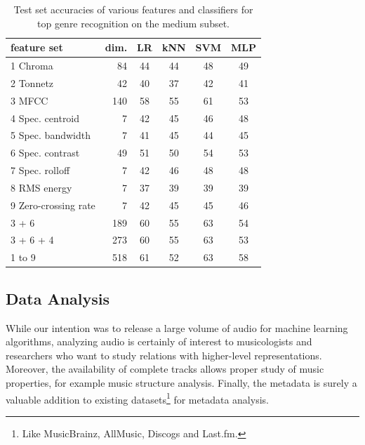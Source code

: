 \documentclass{article}
\newcommand{\tspaceb}{\hspace{0.9em}}
\begin{document}

\begin{table}
	\small
	\centering
	\begin{tabular}{l@{\tspaceb}r@{\tspaceb}c@{\tspaceb}c@{\tspaceb}c@{\tspaceb}c}
		\toprule
		feature set & dim. & LR & kNN & SVM & MLP \\
		\midrule
		1 Chroma \cite{chroma} & 84 & 44 & 44 & 48 & 49 \\
		2 Tonnetz \cite{tonnetz} & 42 & 40 & 37 & 42 & 41 \\
		3 MFCC \cite{mfcc} & 140 & 58 & 55 & 61 & 53 \\
		4 Spec. centroid & 7 & 42 & 45 & 46 & 48 \\
		5 Spec. bandwidth & 7 & 41 & 45 & 44 & 45\\
		6 Spec. contrast \cite{contrast} & 49 & 51 & 50 & 54 & 53 \\
		7 Spec. rolloff & 7 & 42 & 46 & 48 & 48 \\
		8 RMS energy & 7 & 37 & 39 & 39 & 39 \\ %
		9 Zero-crossing rate & 7 & 42 & 45 & 45 & 46 \\
		\midrule
		3 + 6 & 189 & 60 & 55 & 63 & 54 \\
		3 + 6 + 4 & 273 & 60 & 55 & 63 & 53 \\
		1 to 9 & 518 & 61 & 52 & 63 & 58 \\
		\bottomrule
	\end{tabular}
	\caption{Test set accuracies of various features and classifiers for top genre recognition on the medium subset.}
	\label{tab:mgr}
	\label{tab:features}
\end{table}


\subsection{Data Analysis}

While our intention was to release a large volume of audio for machine learning algorithms, analyzing audio is certainly of interest to musicologists and researchers who want to study relations with higher-level representations. 
Moreover, the availability of complete tracks allows proper study of music properties, for example music structure analysis.
Finally, the metadata is surely a valuable addition to existing datasets\footnote{Like MusicBrainz, AllMusic, Discogs and Last.fm.} for metadata analysis.
\end{document}
